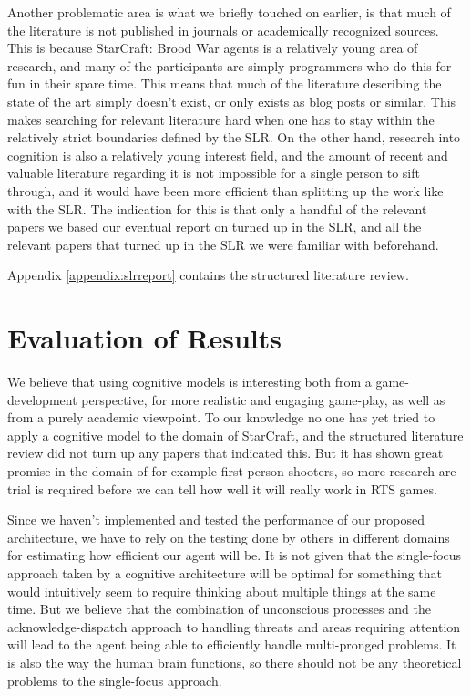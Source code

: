 Another problematic area is what we briefly touched on earlier, is that much of
the literature is not published in journals or academically recognized sources.
This is because StarCraft: Brood War agents is a relatively young area of
research, and many of the participants are simply programmers who do this for
fun in their spare time. This means that much of the literature describing the
state of the art simply doesn't exist, or only exists as blog posts or similar.
This makes searching for relevant literature hard when one has to stay within
the relatively strict boundaries defined by the SLR. On the other hand,
research into cognition is also a relatively young interest field, and the
amount of recent and valuable literature regarding it is not impossible for a
single person to sift through, and it would have been more efficient than
splitting up the work like with the SLR. The indication for this is that only a
handful of the relevant papers we based our eventual report on turned up in the
SLR, and all the relevant papers that turned up in the SLR we were familiar
with beforehand.

Appendix \ref{appendix:slrreport} contains the structured literature review.


\section{Evaluation of Results}
\label{sec:evalres}
We believe that using cognitive models is interesting both from a
game-development perspective, for more realistic and engaging game-play, as well
as from a purely academic viewpoint. To our knowledge no one has yet tried
to apply a cognitive model to the domain of StarCraft, and the structured
literature review did not turn up any papers that indicated this. But it has
shown great promise in the domain of for example first person shooters, so more
research are trial is required before we can tell how well it will really work
in RTS games.

Since we haven't implemented and tested the performance of our proposed
architecture, we have to rely on the testing done by others in different domains
for estimating how efficient our agent will be. It is not given that the
single-focus approach taken by a cognitive architecture will be optimal for
something that would intuitively seem to require thinking about multiple things
at the same time. But we believe that the combination of unconscious processes
and the acknowledge-dispatch approach to handling threats and areas requiring
attention will lead to the agent being able to efficiently handle multi-pronged
problems. It is also the way the human brain functions, so there should not be
any theoretical problems to the single-focus approach.

